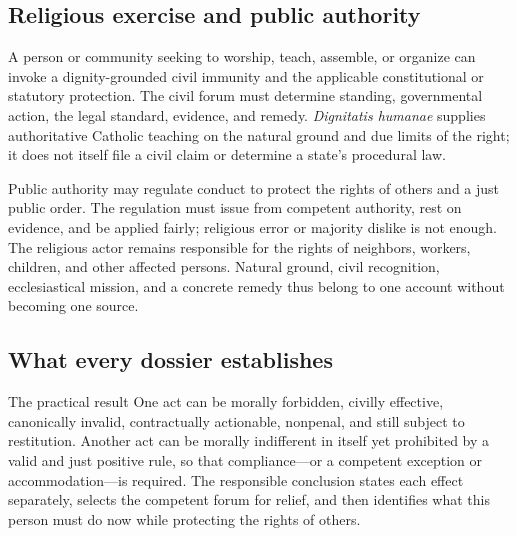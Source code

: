 \subsection{Religious exercise and public authority}

A person or community seeking to worship, teach, assemble, or organize can invoke a dignity-grounded civil immunity and the applicable constitutional or statutory protection. The civil forum must determine standing, governmental action, the legal standard, evidence, and remedy. \emph{Dignitatis humanae} supplies authoritative Catholic teaching on the natural ground and due limits of the right; it does not itself file a civil claim or determine a state's procedural law.

Public authority may regulate conduct to protect the rights of others and a just public order. The regulation must issue from competent authority, rest on evidence, and be applied fairly; religious error or majority dislike is not enough. The religious actor remains responsible for the rights of neighbors, workers, children, and other affected persons. Natural ground, civil recognition, ecclesiastical mission, and a concrete remedy thus belong to one account without becoming one source.

\subsection{What every dossier establishes}

\begin{studybox}{The practical result}
One act can be morally forbidden, civilly effective, canonically invalid, contractually actionable, nonpenal, and still subject to restitution. Another act can be morally indifferent in itself yet prohibited by a valid and just positive rule, so that compliance---or a competent exception or accommodation---is required. The responsible conclusion states each effect separately, selects the competent forum for relief, and then identifies what this person must do now while protecting the rights of others.
\end{studybox}
